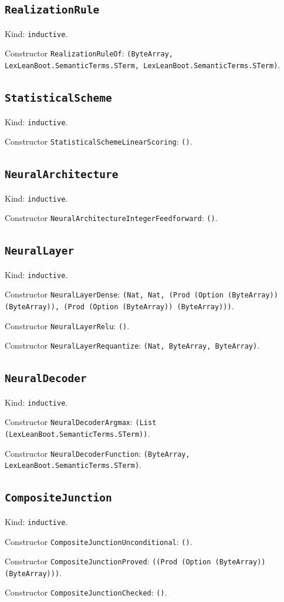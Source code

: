 \documentclass[11pt]{article}
\begin{document}
\subsection*{\texttt{RealizationRule}}
\noindent Kind: \texttt{inductive}.\par
\noindent Constructor \texttt{RealizationRuleOf}: \texttt{(ByteArray, LexLeanBoot.SemanticTerms.STerm, LexLeanBoot.SemanticTerms.STerm)}.\par
\subsection*{\texttt{StatisticalScheme}}
\noindent Kind: \texttt{inductive}.\par
\noindent Constructor \texttt{StatisticalSchemeLinearScoring}: \texttt{()}.\par
\subsection*{\texttt{NeuralArchitecture}}
\noindent Kind: \texttt{inductive}.\par
\noindent Constructor \texttt{NeuralArchitectureIntegerFeedforward}: \texttt{()}.\par
\subsection*{\texttt{NeuralLayer}}
\noindent Kind: \texttt{inductive}.\par
\noindent Constructor \texttt{NeuralLayerDense}: \texttt{(Nat, Nat, (Prod (Option (ByteArray)) (ByteArray)), (Prod (Option (ByteArray)) (ByteArray)))}.\par
\noindent Constructor \texttt{NeuralLayerRelu}: \texttt{()}.\par
\noindent Constructor \texttt{NeuralLayerRequantize}: \texttt{(Nat, ByteArray, ByteArray)}.\par
\subsection*{\texttt{NeuralDecoder}}
\noindent Kind: \texttt{inductive}.\par
\noindent Constructor \texttt{NeuralDecoderArgmax}: \texttt{(List (LexLeanBoot.SemanticTerms.STerm))}.\par
\noindent Constructor \texttt{NeuralDecoderFunction}: \texttt{(ByteArray, LexLeanBoot.SemanticTerms.STerm)}.\par
\subsection*{\texttt{CompositeJunction}}
\noindent Kind: \texttt{inductive}.\par
\noindent Constructor \texttt{CompositeJunctionUnconditional}: \texttt{()}.\par
\noindent Constructor \texttt{CompositeJunctionProved}: \texttt{((Prod (Option (ByteArray)) (ByteArray)))}.\par
\noindent Constructor \texttt{CompositeJunctionChecked}: \texttt{()}.\par
\end{document}
